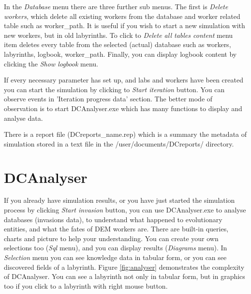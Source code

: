\documentclass[a4paper,12pt]{article}
\begin{document}
In the \textit{Database} menu there are three further sub menus. The first is \textit{Delete workers}, which delete all existing workers from the database and worker related table such as worker\_path. It is useful if you wish to start a new simulation with new workers, but in old labyrinths. To click to \textit{Delete all tables content} menu item deletes every table from the selected (actual) database such as workers, labyrinths, logbook, worker\_path. Finally, you can display logbook content by clicking the \textit{Show logbook} menu.

If every necessary parameter has set up, and labs and workers have been created you can start the simulation by clicking to  \textit{Start iteration} button. You can observe  events in 'Iteration progress data' section. The better mode of observation is to start DCAnalyser.exe which has many functions to display and analyse data.

There is a report file (DCreports\_name.rep) which is a summary the metadata of simulation stored in a text file in the /user/documents/DCreports/ directory.



\section{DCAnalyser}


If you already have simulation results, or you have just started the simulation process by clicking \textit{Start invasion} button, you can use DCAnalyser.exe to analyse databases (invasions data), to understand what happened to evolutionary entities, and what the fates of DEM workers are. There are built-in queries, charts and picture to help your understanding. You can create your own selections too (\textit{Sql} menu), and you can display results (\textit{Diagrams} menu). In \textit{Selection} menu you can see knowledge data in tabular form, or you can see discovered fields of a labyrinth. Figure \ref{fig:analyser} demonstrates the complexity of DCAnalyser. You can see a labyrinth not only in tabular form, but in graphics too if you click to a labyrinth with right mouse button.
\end{document}
